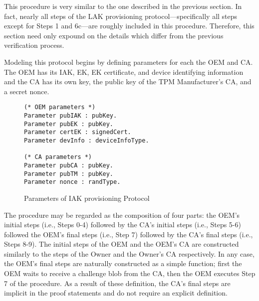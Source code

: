 This procedure is very similar to the one described in the previous section. In fact, nearly all steps of the LAK provisioning protocol---specifically all steps except for Steps 1 and 6c---are roughly included in this procedure. Therefore, this section need only expound on the details which differ from the previous verification process. 

Modeling this protocol begins by defining parameters for each the OEM and CA. The OEM has its IAK, EK, EK certificate, and device identifying information and the CA has its own key, the public key of the TPM Manufacturer's CA, and a secret nonce.
\begin{figure}[h]
\begin{lstlisting}[language=Coq]
(* OEM parameters *)
Parameter pubIAK : pubKey.
Parameter pubEK : pubKey.
Parameter certEK : signedCert.
Parameter devInfo : deviceInfoType.

(* CA parameters *)
Parameter pubCA : pubKey.
Parameter pubTM : pubKey.
Parameter nonce : randType.
\end{lstlisting}
\caption{Parameters of IAK provisioning Protocol}
\end{figure}
The procedure may be regarded as the composition of four parts: the OEM's initial steps (i.e., Steps 0-4) followed by the CA's initial steps (i.e., Steps 5-6) followed the OEM's final steps (i.e., Step 7) followed by the CA's final steps (i.e., Steps 8-9). The initial steps of the OEM and the OEM's CA are constructed similarly to the steps of the Owner and the Owner's CA respectively. In any case, the OEM's final steps are naturally constructed as a simple function; first the OEM waits to receive a challenge blob from the CA, then the OEM executes Step 7 of the procedure. As a result of these definition, the CA's final steps are implicit in the proof statements and do not require an explicit definition. 
